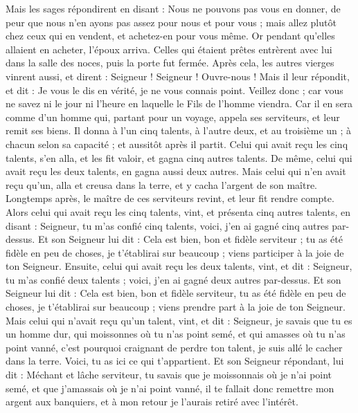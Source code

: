 \begin{multicols}{2}
Mais les sages répondirent en disant : Nous ne pouvons pas vous en donner, de peur que nous n'en ayons pas assez pour nous et pour vous ; mais allez plutôt chez ceux qui en vendent, et achetez-en pour vous même.
Or pendant qu'elles allaient en acheter, l'époux arriva. Celles qui étaient prêtes entrèrent avec lui dans la salle des noces, puis la porte fut fermée.
Après cela, les autres vierges vinrent aussi, et dirent : Seigneur ! Seigneur ! Ouvre-nous !
Mais il leur répondit, et dit : Je vous le dis en vérité, je ne vous connais point.
Veillez donc ; car vous ne savez ni le jour ni l’heure en laquelle le Fils de l’homme viendra.
Car il en sera comme d'un homme qui, partant pour un voyage, appela ses serviteurs, et leur remit ses biens.
Il donna à l'un cinq talents, à l'autre deux, et au troisième un ; à chacun selon sa capacité ; et aussitôt après il partit.
Celui qui avait reçu les cinq talents, s'en alla, et les fit valoir, et gagna cinq autres talents.
De même, celui qui avait reçu les deux talents, en gagna aussi deux autres.
Mais celui qui n'en avait reçu qu'un, alla et creusa dans la terre, et y cacha l'argent de son maître.
Longtemps après, le maître de ces serviteurs revint, et leur fit rendre compte.
Alors celui qui avait reçu les cinq talents, vint, et présenta cinq autres talents, en disant : Seigneur, tu m'as confié cinq talents, voici, j'en ai gagné cinq autres par-dessus.
Et son Seigneur lui dit : Cela est bien, bon et fidèle serviteur ; tu as été fidèle en peu de choses, je t'établirai sur beaucoup ; viens participer à la joie de ton Seigneur.
Ensuite, celui qui avait reçu les deux talents, vint, et dit : Seigneur, tu m'as confié deux talents ; voici, j'en ai gagné deux autres par-dessus.
Et son Seigneur lui dit : Cela est bien, bon et fidèle serviteur, tu as été fidèle en peu de choses, je t'établirai sur beaucoup ; viens prendre part à la joie de ton Seigneur.
Mais celui qui n'avait reçu qu'un talent, vint, et dit : Seigneur, je savais que tu es un homme dur, qui moissonnes où tu n'as point semé, et qui amasses où tu n'as point vanné,
c'est pourquoi craignant de perdre ton talent, je suis allé le cacher dans la terre. Voici, tu as ici ce qui t'appartient.
Et son Seigneur répondant, lui dit : Méchant et lâche serviteur, tu savais que je moissonnais où je n’ai point semé, et que j’amassais où je n’ai point vanné,
il te fallait donc remettre mon argent aux banquiers, et à mon retour je l'aurais retiré avec l'intérêt.

\end{multicols}
